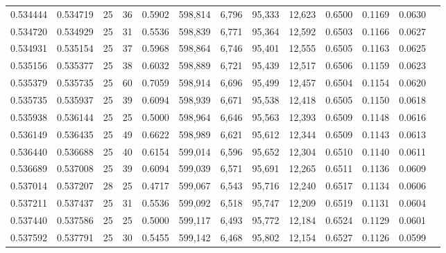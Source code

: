 \begin{tabular}{rrrrrrrrrrrrr}
0.534444 & 0.534719 &    25 &  36 &                                     0.5902 & 598,814 &   6,796 &  95,333 &  12,623 & 0.6500 & 0.1169 & 0.0630 \\
0.534720 & 0.534929 &    25 &  31 &                                     0.5536 & 598,839 &   6,771 &  95,364 &  12,592 & 0.6503 & 0.1166 & 0.0627 \\
0.534931 & 0.535154 &    25 &  37 &                                     0.5968 & 598,864 &   6,746 &  95,401 &  12,555 & 0.6505 & 0.1163 & 0.0625 \\
0.535156 & 0.535377 &    25 &  38 &                                     0.6032 & 598,889 &   6,721 &  95,439 &  12,517 & 0.6506 & 0.1159 & 0.0623 \\
0.535379 & 0.535735 &    25 &  60 &                                     0.7059 & 598,914 &   6,696 &  95,499 &  12,457 & 0.6504 & 0.1154 & 0.0620 \\
0.535735 & 0.535937 &    25 &  39 &                                     0.6094 & 598,939 &   6,671 &  95,538 &  12,418 & 0.6505 & 0.1150 & 0.0618 \\
0.535938 & 0.536144 &    25 &  25 &                                     0.5000 & 598,964 &   6,646 &  95,563 &  12,393 & 0.6509 & 0.1148 & 0.0616 \\
0.536149 & 0.536435 &    25 &  49 &                                     0.6622 & 598,989 &   6,621 &  95,612 &  12,344 & 0.6509 & 0.1143 & 0.0613 \\
0.536440 & 0.536688 &    25 &  40 &                                     0.6154 & 599,014 &   6,596 &  95,652 &  12,304 & 0.6510 & 0.1140 & 0.0611 \\
0.536689 & 0.537008 &    25 &  39 &                                     0.6094 & 599,039 &   6,571 &  95,691 &  12,265 & 0.6511 & 0.1136 & 0.0609 \\
0.537014 & 0.537207 &    28 &  25 &                                     0.4717 & 599,067 &   6,543 &  95,716 &  12,240 & 0.6517 & 0.1134 & 0.0606 \\
0.537211 & 0.537437 &    25 &  31 &                                     0.5536 & 599,092 &   6,518 &  95,747 &  12,209 & 0.6519 & 0.1131 & 0.0604 \\
0.537440 & 0.537586 &    25 &  25 &                                     0.5000 & 599,117 &   6,493 &  95,772 &  12,184 & 0.6524 & 0.1129 & 0.0601 \\
0.537592 & 0.537791 &    25 &  30 &                                     0.5455 & 599,142 &   6,468 &  95,802 &  12,154 & 0.6527 & 0.1126 & 0.0599 \\

\end{tabular}
